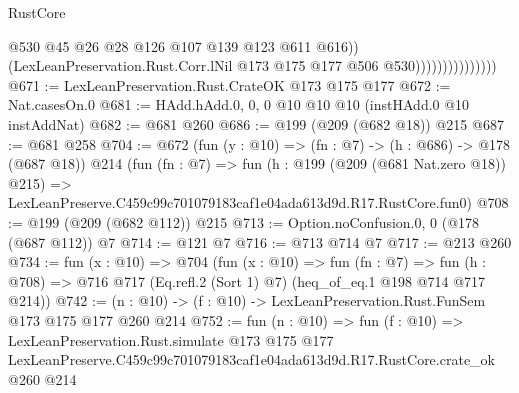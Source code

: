 \begin{lexlean}{RustCore}
\begin{coremodule}
                                    @530
                                    @45
                                    @26
                                    @28
                                    @126
                                    @107
                                    @139
                                    @123
                                    @611
                                    @616))
                                (LexLeanPreservation.Rust.Corr.lNil
                                  @173
                                  @175
                                  @177
                                  @506
                                  @530)))))))))))))))
@671 := LexLeanPreservation.Rust.CrateOK @173 @175 @177
@672 := Nat.casesOn.{0}
@681 := HAdd.hAdd.{0, 0, 0} @10 @10 @10 (instHAdd.{0} @10 instAddNat)
@682 := @681 @260
@686 := @199 (@209 (@682 @18)) @215
@687 := @681 @258
@704 := @672
    (fun (y : @10) => (fn : @7) -> (h : @686) -> @178 (@687 @18))
    @214
    (fun (fn : @7) =>
    fun (h : @199 (@209 (@681 Nat.zero @18)) @215) =>
    LexLeanPreserve.C459c99c701079183caf1e04ada613d9d.R17.RustCore.fun0)
@708 := @199 (@209 (@682 @112)) @215
@713 := Option.noConfusion.{0, 0} (@178 (@687 @112)) @7
@714 := @121 @7
@716 := @713 @714 @7
@717 := @213 @260
@734 := fun (x : @10) =>
  @704
    (fun (x : @10) =>
    fun (fn : @7) =>
    fun (h : @708) => @716 @717 (Eq.refl.{2} (Sort 1) @7) (heq_of_eq.{1} @198 @714 @717 @214))
@742 := (n : @10) -> (f : @10) -> LexLeanPreservation.Rust.FunSem @173 @175 @177 @260 @214
@752 := fun (n : @10) =>
  fun (f : @10) =>
  LexLeanPreservation.Rust.simulate
    @173
    @175
    @177
    LexLeanPreserve.C459c99c701079183caf1e04ada613d9d.R17.RustCore.crate_ok
    @260
    @214
\end{coremodule}
\end{lexlean}

